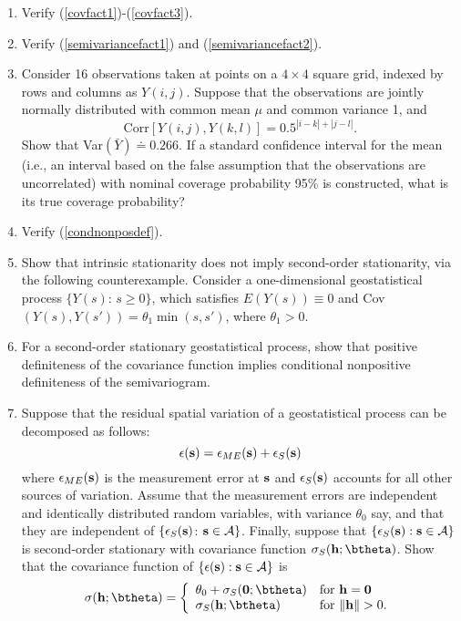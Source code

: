 \begin{enumerate}

\item Verify (\ref{covfact1})-(\ref{covfact3}).

\item Verify (\ref{semivariancefact1}) and (\ref{semivariancefact2}).

\item Consider 16 observations taken at points on a $4\times 4$ square grid, indexed by rows and columns as $Y(i,j)$.  Suppose that the observations are jointly normally distributed with common mean $\mu$ and common variance 1,
and
\[ \mbox{Corr}[Y(i,j),Y(k,l)]=0.5^{|i-k|+|j-l|}. \]
Show that Var$(\bar{Y})\doteq 0.266$.  If a standard confidence interval for the mean (i.e., an interval based on the false assumption that the observations are uncorrelated) with nominal coverage probability 95\% is constructed, what is its true coverage probability?

\item Verify (\ref{condnonposdef}).

\item Show that intrinsic stationarity does not imply second-order
stationarity, via the following counterexample.  Consider a one-dimensional
geostatistical process $\{Y(s)$: $s\geq 0\}$, which satisfies $E(Y(s))\equiv 0$ and
Cov$(Y(s),Y(s'))=\theta_{1}\min (s,s')$, where $\theta_{1}>0$.

\item For a second-order stationary geostatistical process, show that positive
definiteness of the covariance function implies conditional nonpositive
definiteness of the semivariogram.

\item Suppose that the residual spatial variation of a geostatistical process can be decomposed
as follows:
\[ \epsilon({\bf s}) = \epsilon_{ME}({\bf s}) + \epsilon_{S}({\bf s}) \]
where $\epsilon_{ME}({\bf s})$ is the measurement error at ${\bf s}$ and $\epsilon_{S}({\bf s})$ accounts for all other sources of variation.
Assume that the measurement errors are independent and
identically distributed random variables, with variance $\theta_{0}$ say,
and that they are independent of $\{\epsilon_{S}({\bf s})$: ${\bf s}\in {\cal A}\}$.
Finally, suppose that $\{\epsilon_S({\bf s}): {\bf s}\in{\cal A}\}$ is second-order stationary with covariance function $\sigma_{S}({\bf h};\btheta)$.  Show that
the covariance function of $\{\epsilon({\bf s}): {\bf s}\in{\cal A}\}$ is
\[ \sigma({\bf h};\btheta)= \left\{ \begin{array}{ll}
                           \theta_{0} + \sigma_{S}({\bf 0};\btheta) & 
                           \mbox{for ${\bf h}={\bf 0}$} \\
                         \sigma_{S}({\bf h};\btheta) & 
			 \mbox{for $\|{\bf h}\|>0$.} \end{array}
                             \right. \]

\end{enumerate}
